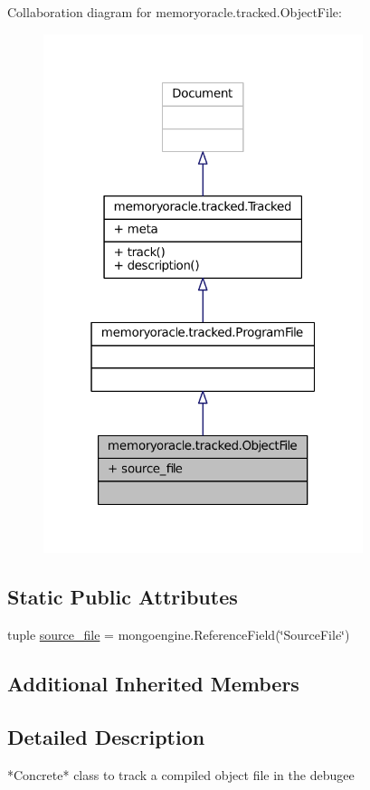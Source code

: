 Collaboration diagram for memoryoracle.\+tracked.\+Object\+File\+:
\nopagebreak
\begin{figure}[H]
\begin{center}
\leavevmode
\includegraphics[width=265pt]{classmemoryoracle_1_1tracked_1_1ObjectFile__coll__graph}
\end{center}
\end{figure}
\subsection*{Static Public Attributes}
\begin{DoxyCompactItemize}
\item 
tuple \hyperlink{classmemoryoracle_1_1tracked_1_1ObjectFile_a7901128346e4f5cd70932b751051fe58}{source\+\_\+file} = mongoengine.\+Reference\+Field(\char`\"{}Source\+File\char`\"{})
\end{DoxyCompactItemize}
\subsection*{Additional Inherited Members}


\subsection{Detailed Description}
\begin{DoxyVerb}*Concrete* class to track a compiled object file in the debugee
\end{DoxyVerb}
 

